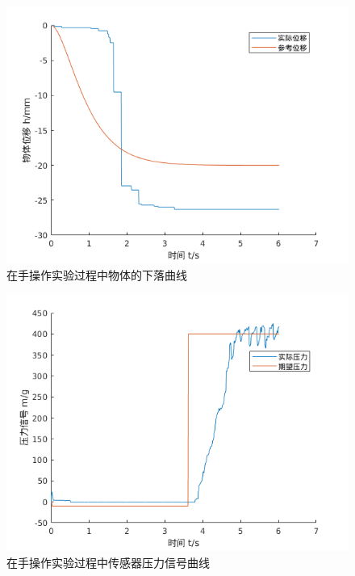 \begin{figure}[!ht]
  \centering
  \includegraphics[width=12cm]{chapter04/pic/h}
  \caption{\label{fig:h}
    在手操作实验过程中物体的下落曲线}
  \vspace{-0.3cm}
\end{figure}

\begin{figure}[!ht]
  \centering
  \includegraphics[width=12cm]{chapter04/pic/f}
  \caption{\label{fig:f}
    在手操作实验过程中传感器压力信号曲线}
  \vspace{-0.3cm}
\end{figure}


